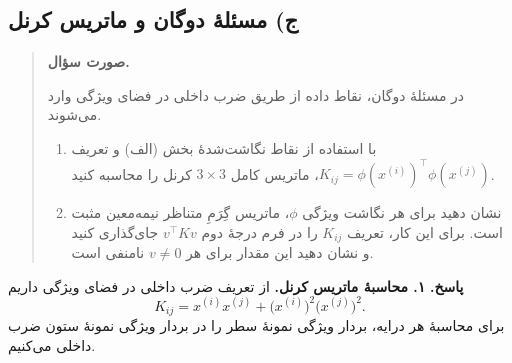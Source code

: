 \documentclass{article}
\numberwithin{equation}{section}
\numberwithin{table}{section}
\newenvironment{questionprompt}{%
    \begin{quote}\noindent\textbf{صورت سؤال.}\enspace\ignorespaces
}{%
    \end{quote}\noindent\textbf{پاسخ.}\enspace\ignorespacesafterend
}
\begin{document}
\subsection*{ج) مسئلهٔ دوگان و ماتریس کرنل}
\begin{questionprompt}
    در مسئلهٔ دوگان، نقاط داده از طریق ضرب داخلی در فضای ویژگی وارد می‌شوند.
    \begin{enumerate}
        \item با استفاده از نقاط نگاشت‌شدهٔ بخش (الف) و تعریف \(K_{ij}=\phi(x^{(i)})^\top\phi(x^{(j)})\)، ماتریس کامل \(3\times3\) کرنل را محاسبه کنید.
        \item نشان دهید برای هر نگاشت ویژگی \(\phi\)، ماتریس گِرَمِ متناظر نیمه‌معین مثبت است. برای این کار، تعریف \(K_{ij}\) را در فرم درجهٔ دوم \(v^\top K v\) جای‌گذاری کنید و نشان دهید این مقدار برای هر \(v\neq 0\) نامنفی است.
    \end{enumerate}
\end{questionprompt}
\textbf{۱. محاسبهٔ ماتریس کرنل.}
از تعریف ضرب داخلی در فضای ویژگی داریم
\[
    K_{ij}=x^{(i)}x^{(j)}+\bigl(x^{(i)}\bigr)^2\bigl(x^{(j)}\bigr)^2.
\]
برای محاسبهٔ هر درایه، بردار ویژگی نمونهٔ سطر را در بردار ویژگی نمونهٔ ستون ضرب داخلی می‌کنیم.
\end{document}
